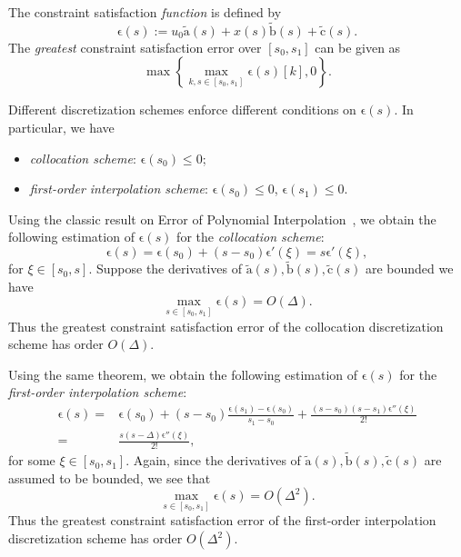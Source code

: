 \documentclass[journal]{IEEEtran}
\theoremstyle{plain}
\theoremstyle{definition}
\theoremstyle{definition}
\renewcommand{\vec}[1]{\bm{\mathrm{#1}}}  %
\begin{document}
The constraint satisfaction \emph{function} is defined by
\begin{equation}
 \label{eq:err-f}
\vec{\epsilon}(s):= u_{0}\tilde{\vec a}(s) + x(s)\tilde{\vec b}(s) +
\tilde{\vec c}(s).
\end{equation}
The \emph{greatest} constraint satisfaction error over
$[s_{0}, s_{1}]$ can be given as
\begin{equation*}
  \max\left\{\max_{k,s\in[s_{0}, s_{1}]}\vec \epsilon(s)[k], 0\right\}.
\end{equation*}
 
Different discretization schemes enforce different conditions on
$\vec \epsilon(s)$.  In particular, we have
\begin{itemize}
\item \emph{collocation scheme}: $\vec \epsilon(s_0) \leq 0$;

\item \emph{first-order interpolation scheme}: $\vec \epsilon(s_0)
  \leq 0$, $\vec \epsilon(s_{1}) \leq 0$. 
\end{itemize}

Using the classic result on Error of Polynomial
Interpolation~\cite[Theorem 2.1.4.1]{Stoer1982}, we obtain the
following estimation of $\vec \epsilon(s)$ for the \emph{collocation
  scheme}:
\begin{equation*}
  \vec \epsilon(s) = \vec \epsilon(s_0) + (s - s_0) \vec \epsilon'(\xi) = s \vec \epsilon'(\xi),
\end{equation*}
for $\xi \in [s_0, s]$. Suppose the derivatives of
$\tilde{\vec a}(s), \tilde{\vec b}(s), \tilde{\vec c}(s)$ are bounded
we have
\begin{equation*}
  \max_{s\in[s_{0}, s_{1}]}\vec \epsilon(s) = O(\Delta).
\end{equation*}
Thus the greatest constraint satisfaction error of the collocation
discretization scheme has order $O(\Delta)$.

Using the same theorem, we obtain the following estimation of
$\vec\epsilon(s)$ for the \emph{first-order interpolation scheme}:
\begin{equation*}
  \begin{aligned}
  \vec \epsilon(s) = &\vec \epsilon(s_0) + (s - s_0)\frac{\vec \epsilon(s_{1}) - \vec \epsilon(s_0)}{s_1-s_0}
   +\frac{(s-s_0)(s - s_{1}) \vec \epsilon''(\xi)}{2!} \\
  =& \frac{s(s - \Delta) \vec \epsilon''(\xi)}{2!},
  \end{aligned}
\end{equation*}
for some $\xi \in [s_0, s_1]$. Again, since the derivatives of
$\tilde{\vec a}(s), \tilde{\vec b}(s), \tilde{\vec c}(s)$ are assumed
to be bounded, we see that
\begin{equation*}
  \max_{s\in[s_{0}, s_{1}]}\vec \epsilon(s) = O(\Delta^2).
\end{equation*}
Thus the greatest constraint satisfaction error of the first-order
interpolation discretization scheme has order $O(\Delta^{2})$.





\end{document}

